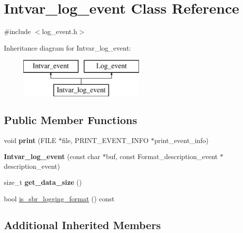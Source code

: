 \hypertarget{classIntvar__log__event}{}\section{Intvar\+\_\+log\+\_\+event Class Reference}
\label{classIntvar__log__event}


{\ttfamily \#include $<$log\+\_\+event.\+h$>$}

Inheritance diagram for Intvar\+\_\+log\+\_\+event\+:\begin{figure}[H]
\begin{center}
\leavevmode
\includegraphics[height=2.000000cm]{classIntvar__log__event}
\end{center}
\end{figure}
\subsection*{Public Member Functions}
\begin{DoxyCompactItemize}
\item 
\mbox{\label{classIntvar__log__event_a108e58f413eed750b94e9f85f7178203}} 
void {\bfseries print} (F\+I\+LE $\ast$file, P\+R\+I\+N\+T\+\_\+\+E\+V\+E\+N\+T\+\_\+\+I\+N\+FO $\ast$print\+\_\+event\+\_\+info)
\item 
\mbox{\label{classIntvar__log__event_a0072da4a2131fbb4e078bcd03e9ed873}} 
{\bfseries Intvar\+\_\+log\+\_\+event} (const char $\ast$buf, const Format\+\_\+description\+\_\+event $\ast$description\+\_\+event)
\item 
\mbox{\label{classIntvar__log__event_a9300b3c1458a7f39500847d6188de120}} 
size\+\_\+t {\bfseries get\+\_\+data\+\_\+size} ()
\item 
bool \mbox{\hyperlink{classIntvar__log__event_adb0ffc05f019430b9d33c4742f92819f}{is\+\_\+sbr\+\_\+logging\+\_\+format}} () const
\end{DoxyCompactItemize}
\subsection*{Additional Inherited Members}


